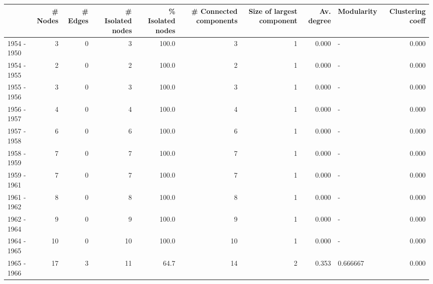 \begin{tabular}{lrrrrrrrlr}
\toprule
{} &  \# Nodes &  \# Edges &  \# Isolated nodes &  \% Isolated nodes &  \# Connected components &  Size of largest component &  Av. degree & Modularity &  Clustering coeff \\
\midrule
1954 - 1950 &        3 &        0 &                 3 &             100.0 &                       3 &                          1 &       0.000 &          - &             0.000 \\
1954 - 1955 &        2 &        0 &                 2 &             100.0 &                       2 &                          1 &       0.000 &          - &             0.000 \\
1955 - 1956 &        3 &        0 &                 3 &             100.0 &                       3 &                          1 &       0.000 &          - &             0.000 \\
1956 - 1957 &        4 &        0 &                 4 &             100.0 &                       4 &                          1 &       0.000 &          - &             0.000 \\
1957 - 1958 &        6 &        0 &                 6 &             100.0 &                       6 &                          1 &       0.000 &          - &             0.000 \\
1958 - 1959 &        7 &        0 &                 7 &             100.0 &                       7 &                          1 &       0.000 &          - &             0.000 \\
1959 - 1961 &        7 &        0 &                 7 &             100.0 &                       7 &                          1 &       0.000 &          - &             0.000 \\
1961 - 1962 &        8 &        0 &                 8 &             100.0 &                       8 &                          1 &       0.000 &          - &             0.000 \\
1962 - 1964 &        9 &        0 &                 9 &             100.0 &                       9 &                          1 &       0.000 &          - &             0.000 \\
1964 - 1965 &       10 &        0 &                10 &             100.0 &                      10 &                          1 &       0.000 &          - &             0.000 \\
1965 - 1966 &       17 &        3 &                11 &              64.7 &                      14 &                          2 &       0.353 &   0.666667 &             0.000 \\

\end{tabular}

